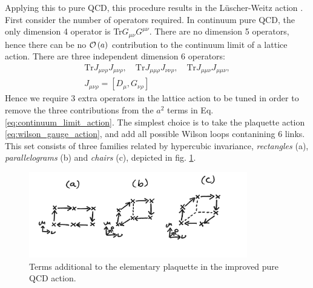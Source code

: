 Applying this to pure QCD, this procedure results in the L\"uscher-Weitz action \cite{luscher1985}. First consider the number of operators required. In continuum pure QCD, the only dimension 4 operator is Tr$G_{\mu\nu}G^{\mu\nu}$. There are no dimension 5 operators, hence there can be no $\mathcal{O}\left( a \right)$ contribution to the continuum limit of a lattice action. There are three independent dimension 6 operators:
\begin{gather}
  \text{Tr} J_{\mu\nu\rho} J_{\mu\nu\rho} ,\quad
  \text{Tr} J_{\mu\mu\rho} J_{\nu\nu\rho} ,\quad
  \text{Tr} J_{\mu\mu\nu} J_{\mu\mu\nu}, \\
  J_{\mu\nu\rho} = [ D_{\mu}, G_{\nu\rho} ] \nonumber
\end{gather}
Hence we require 3 extra operators in the lattice action to be tuned in order to remove the three contributions from the $a^2$ terms in Eq. \eqref{eq:continuum_limit_action}. The simplest choice is to take the plaquette action \eqref{eq:wilson_gauge_action}, and add all possible Wilson loops contanining 6 links. This set consists of three families related by hypercubic invariance, {\it{rectangles}} (a), {\it{parallelograms}} (b) and {\it{chairs}} (c), depicted in fig. \ref{fig:LuscherWeitz}.

\begin{figure}
  \begin{center}
    \vspace{-10pt}
    \includegraphics[width=0.85\textwidth]{images/LuscherWeitz.jpg}
    \vspace{-10pt}
    \caption{Terms additional to the elementary plaquette in the improved pure QCD action. \label{fig:LuscherWeitz}}
    \vspace{-10pt}
  \end{center}
\end{figure}

